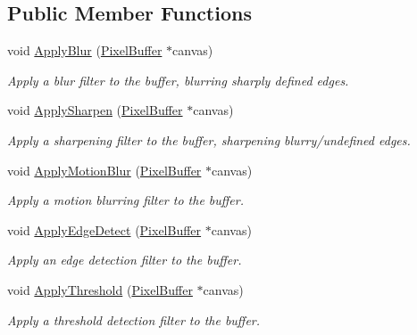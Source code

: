 \subsection*{Public Member Functions}
\begin{DoxyCompactItemize}
\item 
void \hyperlink{classimage__tools_1_1FilterManager_a8ac50631e535ca005119d2f96779373c}{Apply\+Blur} (\hyperlink{classimage__tools_1_1PixelBuffer}{Pixel\+Buffer} $\ast$canvas)
\begin{DoxyCompactList}\small\item\em Apply a blur filter to the buffer, blurring sharply defined edges. \end{DoxyCompactList}\item 
void \hyperlink{classimage__tools_1_1FilterManager_ae877014188da0e4cf40eafdc260bf0da}{Apply\+Sharpen} (\hyperlink{classimage__tools_1_1PixelBuffer}{Pixel\+Buffer} $\ast$canvas)
\begin{DoxyCompactList}\small\item\em Apply a sharpening filter to the buffer, sharpening blurry/undefined edges. \end{DoxyCompactList}\item 
void \hyperlink{classimage__tools_1_1FilterManager_a0c1b30b7ffaf2c967fdc6bfb02363ca3}{Apply\+Motion\+Blur} (\hyperlink{classimage__tools_1_1PixelBuffer}{Pixel\+Buffer} $\ast$canvas)
\begin{DoxyCompactList}\small\item\em Apply a motion blurring filter to the buffer. \end{DoxyCompactList}\item 
void \hyperlink{classimage__tools_1_1FilterManager_acc20c21056545b3bf8d565d415c3a0d0}{Apply\+Edge\+Detect} (\hyperlink{classimage__tools_1_1PixelBuffer}{Pixel\+Buffer} $\ast$canvas)
\begin{DoxyCompactList}\small\item\em Apply an edge detection filter to the buffer. \end{DoxyCompactList}\item 
void \hyperlink{classimage__tools_1_1FilterManager_a987f535a89471a7bdd4f8aa36b9dd601}{Apply\+Threshold} (\hyperlink{classimage__tools_1_1PixelBuffer}{Pixel\+Buffer} $\ast$canvas)
\begin{DoxyCompactList}\small\item\em Apply a threshold detection filter to the buffer. \end{DoxyCompactList}\item 

\end{DoxyCompactItemize}
